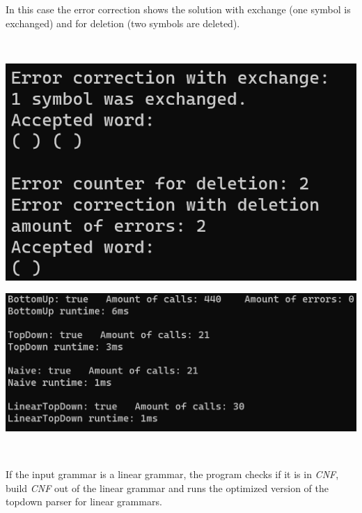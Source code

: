 \documentclass[a4paper, 11pt]{article}
\begin{document}
\begin{minipage}{0.35\textwidth}
In this case the error correction shows the solution with exchange (one symbol is exchanged) and for deletion (two symbols are deleted).

\end{minipage}\begin{minipage}{0.1\textwidth}
\ 
\end{minipage}\begin{minipage}{0.55\textwidth}
\includegraphics[scale=0.7]{images/terminal_4.png}
\end{minipage}

\begin{minipage}{0.5\textwidth}
\includegraphics[scale=0.55]{images/terminal_5.png}
\end{minipage}\begin{minipage}{0.1\textwidth}
\ 
\end{minipage}\begin{minipage}{0.4\textwidth}
If the input grammar is a linear grammar, the program checks if it is in \textit{CNF}, build \textit{CNF} out of the linear grammar and runs the optimized version of the topdown parser for linear grammars.
\end{minipage}
\end{document}
